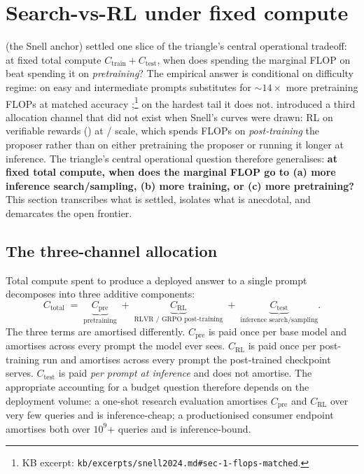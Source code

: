 
\section{Search-vs-RL under fixed compute}
\label{sec:search-vs-rl}

 (the Snell anchor) settled one
slice of the triangle's central operational tradeoff: at fixed total
compute $C_\text{train} + C_\text{test}$, when does spending the
marginal FLOP on  beat spending it on
\emph{pretraining}? The empirical answer is conditional on difficulty
regime: on easy and intermediate prompts  substitutes
for $\sim\!14\times$ more pretraining FLOPs at matched accuracy
\citep[\S 6]{snell2024};\footnote{KB excerpt:
\texttt{kb/excerpts/snell2024.md\#sec-1-flops-matched}.} on the hardest
tail it does not.  introduced a third
allocation channel that did not exist when Snell's curves were drawn:
RL on verifiable rewards () at / scale, which spends
FLOPs on \emph{post-training} the proposer rather than on either
pretraining the proposer or running it longer at inference. The
triangle's central operational question therefore generalises:
\textbf{at fixed total compute, when does the marginal FLOP go to
(a) more inference search/sampling, (b) more  training, or (c)
more pretraining?} This section transcribes what is settled, isolates
what is anecdotal, and demarcates the open frontier.

\subsection{The three-channel allocation}
\label{sec:svr-three-channels}

Total compute spent to produce a deployed answer to a single prompt
decomposes into three additive components:
\begin{equation}
  C_\text{total}
    \;=\; \underbrace{C_\text{pre}}_{\text{pretraining}}
    \;+\; \underbrace{C_\text{RL}}_{\text{RLVR / GRPO post-training}}
    \;+\; \underbrace{C_\text{test}}_{\text{inference search/sampling}}.
  \label{eq:three-channel}
\end{equation}
The three terms are amortised differently. $C_\text{pre}$ is paid once
per base model and amortises across every prompt the model ever sees.
$C_\text{RL}$ is paid once per post-training run and amortises across
every prompt the post-trained checkpoint serves. $C_\text{test}$ is
paid \emph{per prompt at inference} and does not amortise. The
appropriate accounting for a budget question therefore depends on the
deployment volume: a one-shot research evaluation amortises
$C_\text{pre}$ and $C_\text{RL}$ over very few queries and is
inference-cheap; a productionised consumer endpoint amortises both over
$10^9$+ queries and is inference-bound.

